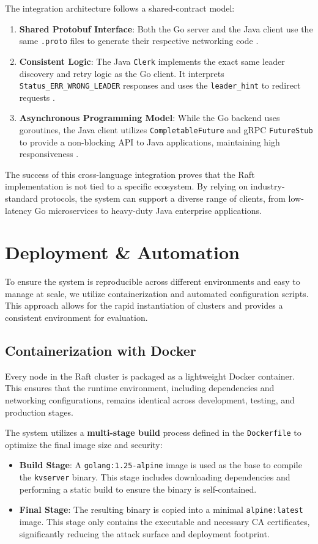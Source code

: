 The integration architecture follows a shared-contract model:
\begin{enumerate}
    \item \textbf{Shared Protobuf Interface}: Both the Go server and the Java client use the same \texttt{.proto} files to generate their respective networking code \cite{10, 11}.
    \item \textbf{Consistent Logic}: The Java \texttt{Clerk} implements the exact same leader discovery and retry logic as the Go client. It interprets \texttt{Status\_ERR\_WRONG\_LEADER} responses and uses the \texttt{leader\_hint} to redirect requests \cite{24, 25}.
    \item \textbf{Asynchronous Programming Model}: While the Go backend uses goroutines, the Java client utilizes \texttt{CompletableFuture} and gRPC \texttt{FutureStub} to provide a non-blocking API to Java applications, maintaining high responsiveness \cite{24}.
\end{enumerate}

The success of this cross-language integration proves that the Raft implementation is not tied to a specific ecosystem.
By relying on industry-standard protocols, the system can support a diverse range of clients, from low-latency Go microservices to heavy-duty Java enterprise applications.

\section{Deployment \& Automation}
\label{sec:deployment_automation}
To ensure the system is reproducible across different environments and easy to manage at scale, we utilize containerization and automated configuration scripts. This approach allows for the rapid instantiation of clusters and provides a consistent environment for evaluation.

\subsection{Containerization with Docker}
Every node in the Raft cluster is packaged as a lightweight Docker container. This ensures that the runtime environment, including dependencies and networking configurations, remains identical across development, testing, and production stages.

The system utilizes a \textbf{multi-stage build} process defined in the \texttt{Dockerfile} to optimize the final image size and security:
\begin{itemize}
    \item \textbf{Build Stage}: A \texttt{golang:1.25-alpine} image is used as the base to compile the \texttt{kvserver} binary. This stage includes downloading dependencies and performing a static build to ensure the binary is self-contained.
    \item \textbf{Final Stage}: The resulting binary is copied into a minimal \texttt{alpine:latest} image. This stage only contains the executable and necessary CA certificates, significantly reducing the attack surface and deployment footprint.
\end{itemize}

